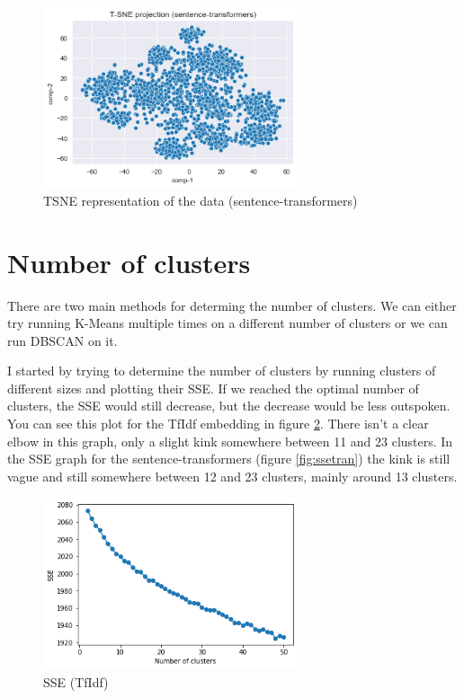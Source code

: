 \documentclass{article}
\begin{document}
\begin{figure}[h!]
\centering
\includegraphics[width=75mm]{tsne-transformers.png}
\caption{TSNE representation of the data (sentence-transformers)}
\label{fig:tsnettransf}
\end{figure}

\section{Number of clusters}
There are two main methods for determing the number of clusters. We can either try running K-Means multiple times on a different number of clusters or we can run DBSCAN on it.

I started by trying to determine the number of clusters by running clusters of different sizes and plotting their SSE. If we reached the optimal number of clusters, the SSE would still decrease, but the decrease would be less outspoken. You can see this plot for the TfIdf embedding in figure \ref{fig:ssetfidf}. There isn't a clear elbow in this graph, only a slight kink somewhere between 11 and 23 clusters. In the SSE graph for the sentence-transformers (figure \ref{fig:ssetran}) the kink is still vague and still somewhere between 12 and 23 clusters, mainly around 13 clusters.

\begin{figure}[h!]
\centering
\includegraphics[width=75mm]{sse-tfidf.png}
\caption{SSE (TfIdf)}
\label{fig:ssetfidf}
\end{figure}
\end{document}
